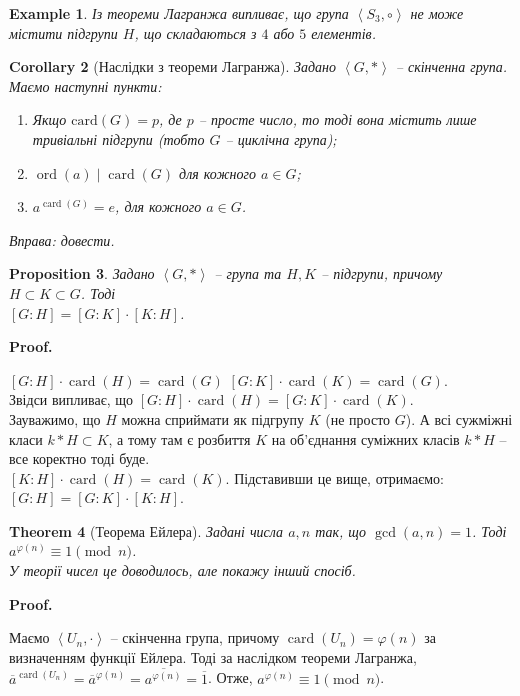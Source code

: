 \documentclass[a4paper, 10pt]{article}
\makeatletter
\theoremstyle{theoremdd}
\newtheorem{theorem}{Theorem}[subsection]
\theoremstyle{theoremdd}
\theoremstyle{theoremdd}
\theoremstyle{theoremdd}
\theoremstyle{theoremdd}
\newtheorem{example}[theorem]{Example}
\theoremstyle{theoremdd}
\theoremstyle{theoremdd}
\theoremstyle{theoremdd}
\theoremstyle{theoremdd}
\newtheorem{proposition}[theorem]{Proposition}
\theoremstyle{theoremdd}
\theoremstyle{theoremdd}
\theoremstyle{theoremdd}
\theoremstyle{theoremdd}
\theoremstyle{theoremdd}
\newtheorem{corollary}[theorem]{Corollary}
\theoremstyle{theoremdd}
\renewenvironment{proof}[1][Proof.\\]{\par
\pushQED{\hfill \qed}%
\normalfont \topsep6\p@\@plus6\p@\relax
\trivlist
\item\relax
{\bfseries
#1\@addpunct{.}}\hspace\labelsep\ignorespaces
}{%
\popQED\endtrivlist\@endpefalse
}
\DeclareMathOperator{\ord}{ord}
\DeclareMathOperator{\card}{card}
\makeatother
\begin{document}
\begin{example}
Із теореми Лагранжа випливає, що група $\left<S_3, \circ \right>$ не може містити підгрупи $H$, що складаються з $4$ або $5$ елементів.
\end{example}

\begin{corollary}[Наслідки з теореми Лагранжа]
Задано $\left< G,*\right>$ -- скінченна група. Маємо наступні пункти:
\begin{enumerate}[nosep,wide=0pt,label={\arabic*)}]
\item Якщо $\text{card}(G) = p$, де $p$ -- просте число, то тоді вона містить лише тривіальні підгрупи (тобто $G$ -- циклічна група);
\item $\ord(a) \mid \card(G)$ для кожного $a \in G$;
\item $a^{\card(G)} = e$, для кожного $a \in G$.
\end{enumerate}
\textit{Вправа: довести.}
\end{corollary}

\begin{proposition}
Задано $\left< G,*\right>$ -- група та $H,K$ -- підгрупи, причому $H \subset K \subset G$. Тоді \\
$[G:H] = [G:K] \cdot [K:H]$.
\end{proposition}

\begin{proof}
$[G:H] \cdot \card(H) = \card(G)$ \qquad $[G:K] \cdot \card(K) = \card(G)$.\\
Звідси випливає, що $[G:H] \cdot \card(H) = [G:K] \cdot \card(K)$.\\
Зауважимо, що $H$ можна сприймати як підгрупу $K$ (не просто $G$). А всі сужміжні класи $k*H \subset K$, а тому там є розбиття $K$ на об'єднання суміжних класів $k*H$ -- все коректно тоді буде.\\
$[K:H] \cdot \card(H) = \card(K)$. Підставивши це вище, отримаємо:\\
$[G:H] = [G:K] \cdot [K:H]$.
\end{proof}

\begin{theorem}[Теорема Ейлера]
Задані числа $a,n$ так, що $\gcd(a,n) = 1$. Тоді $a^{\varphi(n)} \equiv 1 \pmod n$.\\
\textit{У теорії чисел це доводилось, але покажу інший спосіб.}
\end{theorem}

\begin{proof}
Маємо $\left<U_n,\cdot\right>$ -- скінченна група, причому $\card(U_n) = \varphi(n)$ за визначенням функції Ейлера. Тоді за наслідком теореми Лагранжа, $\overline{a}^{\card(U_n)} = \overline{a}^{\varphi(n)} = \overline{a^{\varphi(n)}} = \overline{1}$. Отже,  $a^{\varphi(n)} \equiv 1 \pmod n$.
\end{proof}
\end{document}
